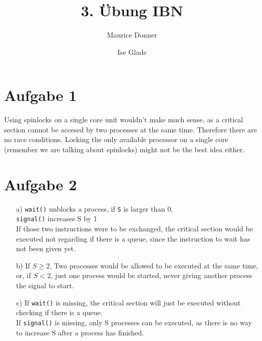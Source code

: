 \documentclass{article}
\title{\textsf{\color{blue!40!black}3. Übung IBN}}
\author{Maurice Donner \and Ise Glade}
\begin{document}
\maketitle
\newpage

\section*{Aufgabe 1}
Using spinlocks on a single core unit wouldn't make much sense, as a
critical section cannot be accesed by two processes at the same time.
Therefore there are no race conditions. Locking the only available
processor on a single core (remember we are talking about
spinlocks) might not be the best idea either.
\section*{Aufgabe 2}
\begin{itemize}
    \item[a)] 
	\verb=wait()= unblocks a process, if \verb=S= is larger than 0.\\
	\verb=signal()= increases S by 1\\
	If those two instructions were to be exchanged, the critical section
	would be executed not regarding if there is a queue, since
	the instruction to wait has not been given yet.
    \item[b)]
	If \( S \geq 2 \), Two processes would be allowed to be executed
	at the same time, or, if \( S < 2 \), just one process would
	be started, never giving another process the signal to start.
    \item[c)]
	If \verb=wait()= is missing, the critical section will just be executed
	without checking if there is a queue.\\
	If \verb=signal()= is missing, only S processes can be executed, as
	there is no way to increase S after a process has finished.
\end{itemize}
\end{document}
